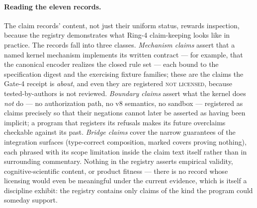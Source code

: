 \paragraph{Reading the eleven records.} The claim records' content, not just their uniform status, rewards inspection, because the registry demonstrates what Ring-4 claim-keeping looks like in practice. The records fall into three classes. \emph{Mechanism claims} assert that a named kernel mechanism implements its written contract --- for example, that the canonical encoder realizes the closed rule set --- each bound to the specification digest and the exercising fixture families; these are the claims the Gate-4 receipt is \emph{about}, and even they are registered \textsc{not licensed}, because tested-by-authors is not reviewed. \emph{Boundary claims} assert what the kernel does \emph{not} do --- no authorization path, no v8 semantics, no sandbox --- registered as claims precisely so that their negations cannot later be asserted as having been implicit; a program that registers its refusals makes its future overclaims checkable against its past. \emph{Bridge claims} cover the narrow guarantees of the integration surfaces (type-correct composition, marked covers proving nothing), each phrased with its scope limitation inside the claim text itself rather than in surrounding commentary. Nothing in the registry asserts empirical validity, cognitive-scientific content, or product fitness --- there is no record whose licensing would even be meaningful under the current evidence, which is itself a discipline exhibit: the registry contains only claims of the kind the program could someday support.


